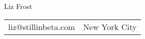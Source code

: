 \centering
\textmd{\Huge Liz Frost} \\
\begin{tabular}{c | c}
liz@stillinbeta.com &
New York City
\end{tabular}

\raggedright
